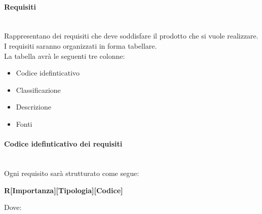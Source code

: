 \paragraph{Requisiti}\mbox{}\\
Rappresentano dei requisiti che deve soddisfare il prodotto che si vuole realizzare.\\
I requisiti saranno organizzati in forma tabellare.\\
La tabella avrà le seguenti tre colonne:
\begin{itemize}
	\item Codice idefinticativo
	\item Classificazione
	\item Descrizione
	\item Fonti
\end{itemize}
\paragraph{Codice idefinticativo dei requisiti}\mbox{}\\
Ogni requisito sarà strutturato come segue:
\begin{center}
	\textbf{R[Importanza][Tipologia][Codice]}
\end{center}
Dove:
